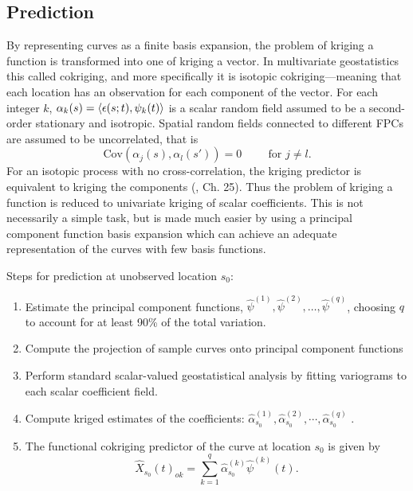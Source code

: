 \subsection{Prediction} 

\label{sec:functional_kriging_predictor}

By representing curves as a finite basis expansion, the problem of kriging a function is transformed into one of kriging a vector. In multivariate geostatistics this called cokriging, and more specifically it is isotopic cokriging---meaning that each location has an observation for each component of the vector. For each integer $k$, $\alpha_k(s) = \langle \epsilon(s;t),  \psi_k(t) \rangle$ is a scalar random field assumed to be a second-order stationary and isotropic. Spatial random fields connected to different FPCs are assumed to be uncorrelated, that is
\begin{equation}
	\text{Cov}(\alpha_j(s), \alpha_l(s')) = 0 \hspace{1cm} \text{for } j \neq l. \label{eq:nocrosscor}
\end{equation}
For an isotopic process with no cross-correlation, the kriging predictor is equivalent to kriging the components (\cite{wackernagel2003multivariate}, Ch. 25). Thus the problem of kriging a function is reduced to univariate kriging of scalar coefficients. This is not necessarily a simple task, but is made much easier by using a principal component function basis expansion which can achieve an adequate representation of the curves with few basis functions.

Steps for prediction at unobserved location $s_0$: 
\begin{enumerate}
	\item Estimate the principal component functions, $\hat{\psi}^{(1)}, \hat{\psi}^{(2)}, \dots, \hat{\psi}^{(q)}$, choosing $q$ to account for at least 90\% of the total variation. 
	\item Compute the projection of sample curves onto principal component functions 
	\item Perform standard scalar-valued geostatistical analysis by fitting variograms to each scalar coefficient field.
	\item Compute kriged estimates of the coefficients: $\hat{\alpha}_{s_0}^{(1)}, \hat{\alpha}_{s_0}^{(2)}, \cdots, \hat{\alpha}_{s_0}^{(q)}$ .
	\item The functional cokriging predictor of the curve at location $s_0$ is given by
	\begin{equation}
		\widehat{X}_{s_0}(t)_{ok} = \sum_{k=1}^{q} \hat{\alpha}_{s_0}^{(k)}\hat{\psi}^{(k)}(t).
	\end{equation} 
	
\end{enumerate}


